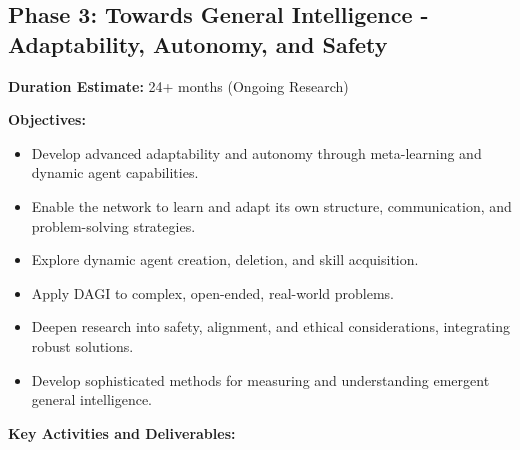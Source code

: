 \documentclass[12pt]{amsart}
\begin{document}
\subsection{Phase 3: Towards General Intelligence - Adaptability, Autonomy, and Safety}
\label{subsec:phase3}
\textbf{Duration Estimate:} 24+ months (Ongoing Research)

\textbf{Objectives:}
\begin{itemize}[leftmargin=*]
    \item Develop advanced adaptability and autonomy through meta-learning and dynamic agent capabilities.
    \item Enable the network to learn and adapt its own structure, communication, and problem-solving strategies.
    \item Explore dynamic agent creation, deletion, and skill acquisition.
    \item Apply DAGI to complex, open-ended, real-world problems.
    \item Deepen research into safety, alignment, and ethical considerations, integrating robust solutions.
    \item Develop sophisticated methods for measuring and understanding emergent general intelligence.
\end{itemize}
\textbf{Key Activities and Deliverables:}
\end{document}
